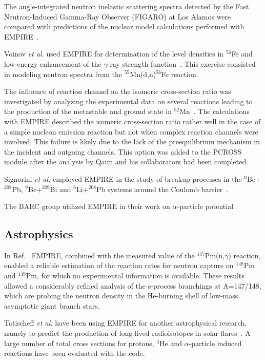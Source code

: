 \documentclass[twocolumn,amsmath,amssymb,10pt,groupedaddress,a4paper]{revtex4}
\begin{document}
The angle-integrated neutron inelastic scattering spectra detected by the Fast Neutron-Induced Gamma-Ray Observer (FIGARO) at Los Alamos were compared with predictions of the nuclear model calculations performed with EMPIRE~\cite{rochman2004nir}.

Voinov \textit{et al.} used EMPIRE for determination of the level densities in $^{56}$Fe
and low-energy enhancement of the $\gamma$-ray strength function~\cite{Voinov:06}.
This exercise consisted in modeling neutron spectra from the $^{55}$Mn(d,n)$^{56}$Fe reaction.

The influence of reaction channel on the isomeric cross-section ratio was investigated by analyzing the experimental data on several reactions leading to the production of the metastable and ground state in $^{52}$Mn~\cite{Qaim:05}. The calculations with EMPIRE described the isomeric cross-section ratio rather well in the case of a simple nucleon emission reaction but not when complex reaction channels were involved. This failure is likely due to the lack of the preequilibrium mechanism in the incident and outgoing channels. This option was added to the PCROSS module after the analysis by Qaim and his collaborators had been completed.

Signorini \textit{et al.} employed EMPIRE in the study of breakup processes in the $^9$Be+$^{208}$Pb, $^9$Be+$^{209}$Bi and $^6$Li+$^{208}$Pb systems around the Coulomb barrier~\cite{signorini2004bps}.

The BARC group utilized EMPIRE in their work on $\alpha$-particle potential~\cite{Kumar:06}

\subsection{Astrophysics}
In Ref.~\cite{reifarth2003snc} EMPIRE, combined
with the measured value of the $^{147}$Pm(n,$\gamma$) reaction, enabled a reliable estimation of the reaction rates for neutron capture on $^{148}$Pm and $^{149}$Pm, for which no experimental information is available. These results allowed a considerably refined analysis of the s-process branchings at A=147/148, which are probing the neutron density in the He-burning shell of low-mass asymptotic giant branch stars.

Tatischeff \textit{et al.} have been using EMPIRE for another astrophysical research, namely to predict the production of long-lived radioisotopes in solar flares~\cite{Tatischeff:06}. A large number of total cross sections for protons, $^3$He and $\alpha$-particle induced reactions have been evaluated with the code.
\end{document}
